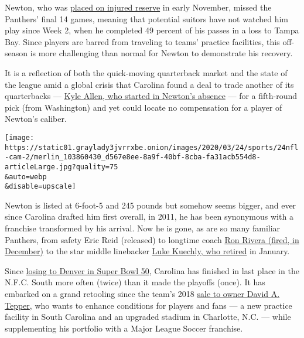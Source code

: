 Newton, who was
\href{https://www.nytimes3xbfgragh.onion/2019/11/05/sports/football/cam-newton-injury-season.html}{placed
on injured reserve} in early November, missed the Panthers' final 14
games, meaning that potential suitors have not watched him play since
Week 2, when he completed 49 percent of his passes in a loss to Tampa
Bay. Since players are barred from traveling to teams' practice
facilities, this off-season is more challenging than normal for Newton
to demonstrate his recovery.

It is a reflection of both the quick-moving quarterback market and the
state of the league amid a global crisis that Carolina found a deal to
trade another of its quarterbacks ---
\href{https://www.nytimes3xbfgragh.onion/2019/10/21/sports/football/backup-quarterback-teddy-bridgewater-mahomes.html}{Kyle
Allen, who started in Newton's absence} --- for a fifth-round pick (from
Washington) and yet could locate no compensation for a player of
Newton's caliber.

\texttt{[image: https://static01.graylady3jvrrxbe.onion/images/2020/03/24/sports/24nfl-cam-2/merlin\_103860430\_d567e8ee-8a9f-40bf-8cba-fa31acb554d8-articleLarge.jpg?quality=75\\\&auto=webp\\\&disable=upscale]}

Newton is listed at 6-foot-5 and 245 pounds but somehow seems bigger,
and ever since Carolina drafted him first overall, in 2011, he has been
synonymous with a franchise transformed by his arrival. Now he is gone,
as are so many familiar Panthers, from safety Eric Reid (released) to
longtime coach
\href{https://www.nytimes3xbfgragh.onion/2019/12/04/sports/football/why-was-ron-rivera-fired.html}{Ron
Rivera (fired, in December)} to the star middle linebacker
\href{https://www.nytimes3xbfgragh.onion/2020/01/15/sports/football/luke-kuechly-concussions-retire.html}{Luke
Kuechly, who retired} in January.

Since
\href{https://www.nytimes3xbfgragh.onion/2016/02/08/sports/football/broncos-win-super-bowl-50.html}{losing
to Denver in Super Bowl 50}, Carolina has finished in last place in the
N.F.C. South more often (twice) than it made the playoffs (once). It has
embarked on a grand retooling since the team's 2018
\href{https://www.nytimes3xbfgragh.onion/2018/05/15/sports/football/carolina-panthers-sold-jerry-richardson-david-tepper.html}{sale
to owner David A. Tepper}, who wants to enhance conditions for players
and fans --- a new practice facility in South Carolina and an upgraded
stadium in Charlotte, N.C. --- while supplementing his portfolio with a
Major League Soccer franchise.

